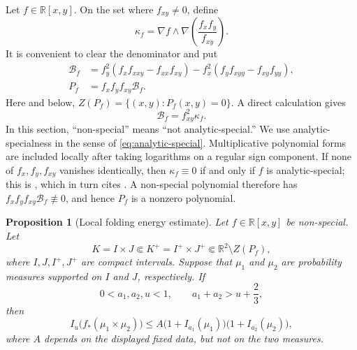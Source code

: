 \documentclass[11pt]{article}
\newtheorem{proposition}[theorem]{Proposition}
\begin{document}
Let $f\in\mathbb R[x,y]$.  On the set where $f_{xy}\neq0$, define
\begin{equation}
 \kappa_f=\nabla f\wedge
 \nabla\left(\frac{f_xf_y}{f_{xy}}\right).
 \label{eq_pham_kappa}
\end{equation}
It is convenient to clear the denominator and put
\begin{align}
 \mathcal B_f
 &=f_y^2(f_xf_{xxy}-f_{xx}f_{xy})
 -f_x^2(f_yf_{xyy}-f_{xy}f_{yy}),
 \label{eq_pham_cleared_curvature}\\
 P_f&=f_xf_yf_{xy}\mathcal B_f.
 \label{eq_pham_bad_polynomial}
\end{align}
Here and below, $Z(P_f)=\{(x,y):P_f(x,y)=0\}$.
A direct calculation gives
\begin{equation}
 \mathcal B_f=f_{xy}^{2}\kappa_f.
 \label{eq_pham_curvature_identity}
\end{equation}
In this section, ``non-special'' means ``not analytic-special.''
We use analytic-specialness in the sense of
\eqref{eq:analytic-special}.  Multiplicative polynomial forms are
included locally after taking logarithms on a regular sign component.
If none of \(f_x,f_y,f_{xy}\) vanishes identically, then
\(\kappa_f\equiv0\) if and only if \(f\) is analytic-special; this is
\cite[Lemma~4.4]{PhamFIO}, which in turn cites
\cite[Lemma~3.3]{RZ}.  A non-special polynomial therefore has
\(f_xf_yf_{xy}\mathcal B_f\not\equiv0\), and hence \(P_f\) is a
nonzero polynomial.
\begin{proposition}[Local folding energy estimate]
\label{prop_pham_local_energy}
Let $f\in\mathbb R[x,y]$ be non-special.  Let
\[
 K=I\times J\Subset K^+=I^+\times J^+
 \Subset\mathbb R^2\setminus Z(P_f),
\]
where $I,J,I^+,J^+$ are compact intervals.  Suppose that $\mu_1$ and
$\mu_2$ are probability measures supported on $I$ and $J$,
respectively.  If
\[
 0<a_1,a_2,u<1,
 \qquad a_1+a_2>u+\frac{2}{3},
\]
then
\begin{equation}
 I_u\big(f_*(\mu_1\times\mu_2)\big)
 \leq A
 \bigl(1+I_{a_1}(\mu_1)\bigr)
 \bigl(1+I_{a_2}(\mu_2)\bigr),
 \label{eq_pham_local_energy}
\end{equation}
where $A$ depends on the displayed fixed data, but not on the two
measures.
\end{proposition}
\end{document}
